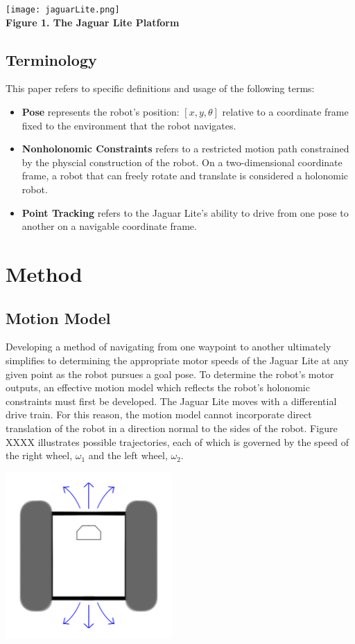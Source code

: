 \documentclass[conference]{IEEEtran}
\begin{document}
\texttt{[image: jaguarLite.png]}\\
\textbf{Figure 1. The Jaguar Lite Platform}

\subsection{Terminology}
This paper refers to specific definitions and usage of the following terms:

\begin{itemize}
\item \noindent \textbf{Pose} represents the robot's position: $[x,y,\theta]$ relative to a 
coordinate frame fixed to the environment that the robot navigates.
 
\item \noindent \textbf{Nonholonomic Constraints} refers to a restricted motion path 
constrained by the physcial construction of the robot.  On a two-dimensional coordinate 
frame, a robot that can freely
rotate and translate is considered a holonomic robot. 

\item \noindent \textbf{Point Tracking} refers to the Jaguar Lite's ability to drive
from one pose to another on a navigable coordinate frame.

\end{itemize}

\section{Method}

\subsection{Motion Model}
Developing a method of navigating from one waypoint to another ultimately 
simplifies to determining the appropriate motor speeds of the Jaguar Lite at any
given point as the robot pursues a goal pose.  
To determine the robot's motor outputs, an effective motion model which reflects
the robot's holonomic constraints must first be developed.  The Jaguar Lite 
moves with a differential drive train.  For this reason, the motion model cannot 
incorporate direct translation of the robot in a direction normal to the sides of
the robot. Figure XXXX illustrates possible trajectories, each of which is 
governed by the speed of the right wheel, $\omega_1$ and the left wheel, $\omega_2$.

\includegraphics[width =2.5in]{pic1.png}
\end{document}
